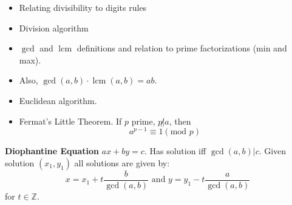 \documentclass[12pt]{amsart}
\DeclareMathOperator{\lcm}{lcm}
\begin{document}
\begin{multicols}{2}
\begin{itemize}
    \item Relating divisibility to digits rules
    \item Division algorithm
    \item $\gcd$ and $\lcm$ definitions and relation to prime factorizations (min and max).
    \item Also, $\gcd(a,b) \cdot \lcm(a,b) = ab$.
    \item Euclidean algorithm.
    \item Fermat's Little Theorem. If $p$ prime, $p \not| a$, then
        \begin{equation*}
            a^{p-1}\equiv1(\text{mod }p)
        \end{equation*}
\end{itemize}

    \textbf{Diophantine Equation} $ax+by=c$. Has solution iff $\gcd(a,b) | c$. Given solution $(x_1,y_1)$ all solutions are given by:
    \begin{equation*}
        x = x_1+ t\frac{b}{\gcd(a,b)} \text{ and } y = y_1- t\frac{a}{\gcd(a,b)} 
        \end{equation*}
        for $t \in \mathbb{Z}$.
\end{multicols}
\end{document}
